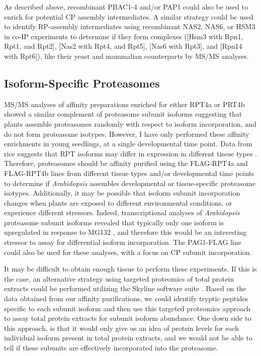 	As described above, recombinant PBAC1-4 and/or PAP1 could also be used to enrich for potential CP assembly intermediates. A similar strategy could be used to identify RP-assembly intermediates using recombinant NAS2, NAS6, or HSM3 in co-IP experiments to determine if they form complexes ([Hsm3 with Rpn1, Rpt1, and Rpt2], [Nas2 with Rpt4, and Rpt5], [Nas6 with Rpt3], and [Rpn14 with Rpt6]), like their yeast and mammalian counterparts by MS/MS analyses.

\subsection{Isoform-Specific Proteasomes}
	MS/MS analyses of affinity preparations enriched for either RPT4a or PRT4b showed a similar complement of proteasome subunit isoforms suggesting that plants assemble proteasomes randomly with respect to isoform incorporation, and do not form proteasome isotypes. However, I have only performed these affinity enrichments in young seedlings, at a single developmental time point. Data from rice suggests that RPT isoforms may differ in expression in different tissue types \citep{shibahara04}. Therefore, proteasomes should be affinity purified using the FLAG-RPT4a and FLAG-RPT4b lines from different tissue types and/or developmental time points to determine if \textit{Arabidopsis} assembles developmental or tissue-specific proteasome isotypes. Additionally, it may be possible that isoform subunit incorporation changes when plants are exposed to different environmental conditions, or experience different stressors. Indeed, transcriptional analyses of  \textit{Arabidopsis} proteasome subunit isoforms revealed that typically only one isoform is upregulated in response to MG132 \citep{gladman16}, and therefore this would be an interesting stressor to assay for differential isoform incorporation.  The PAG1-FLAG line could also be used for these analyses, with a focus on CP subunit incorporation. 
	
	It may be difficult to obtain enough tissue to perform these experiments. If this is the case, an alternative strategy using targeted proteomics of total protein extracts could be performed utilizing the Skyline software suite \citep{maclean10}. Based on the data obtained from our affinity purifications, we could identify tryptic peptides specific to each subunit isoform and then use this targeted proteomics approach to assay total protein extracts for subunit isoform abundance. One down side to this approach, is that it would only give us an idea of protein levels for each individual isoform present in total protein extracts, and we would not be able to tell if these subunits are effectively incorporated into the proteasome. 

